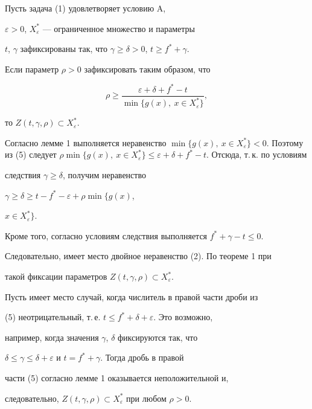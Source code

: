 \begin{cor}


Пусть задача (1) удовлетворяет условию A,


$\varepsilon>0$, $X_{\varepsilon}^*$ --- ограниченное множество и параметры


$t$, $\gamma$ зафиксированы так, что $\gamma\ge\delta>0$, $t\ge f^*+\gamma$.


Если параметр $\rho>0$ зафиксировать таким образом, что


\begin{equation}


\rho\ge\frac{\varepsilon+\delta+f^*-t}{\min\{g(x),\ x\in


X_{\varepsilon}^*\}},


\end{equation}


то $Z(t,\gamma,\rho)\subset X_{\varepsilon}^*$.


\end{cor}





\begin{pf}


Согласно лемме 1 выполняется неравенство $\min\{g(x),\ x\in


X_{\varepsilon}^*\}<0$. Поэтому из (5) следует $\rho\min\{g(x),\ x\in


X_{\varepsilon}^*\}\le \varepsilon+\delta+f^*-t$. Отсюда, т.\,к. по условиям


следствия $\gamma\ge\delta$, получим неравенство 


$\gamma\ge\delta\ge t-f^*-\varepsilon+\rho\min\{g(x)$,


$x\in X_{\varepsilon}^*\}$. 


Кроме того, согласно условиям следствия выполняется $f^*+\gamma-t\le0$.


Следовательно, имеет место двойное неравенство (2). По теореме 1 при


такой фиксации параметров $Z(t,\gamma,\rho)\subset X_{\varepsilon}^*$.


\end{pf}





\begin{notenonum}


Пусть имеет место случай, когда числитель в правой части дроби из


(5) неотрицательный, т.\,е. $t\le f^*+\delta+\varepsilon$. Это возможно,


например, когда значения $\gamma$, $\delta$ фиксируются так, что


$\delta\le\gamma\le\delta+\varepsilon$ и $t=f^*+\gamma$. Тогда дробь в правой


части (5) согласно лемме 1 оказывается неположительной и,


следовательно, $Z(t,\gamma,\rho)\subset X_{\varepsilon}^*$ при любом $\rho>0$. 


\end{notenonum}





